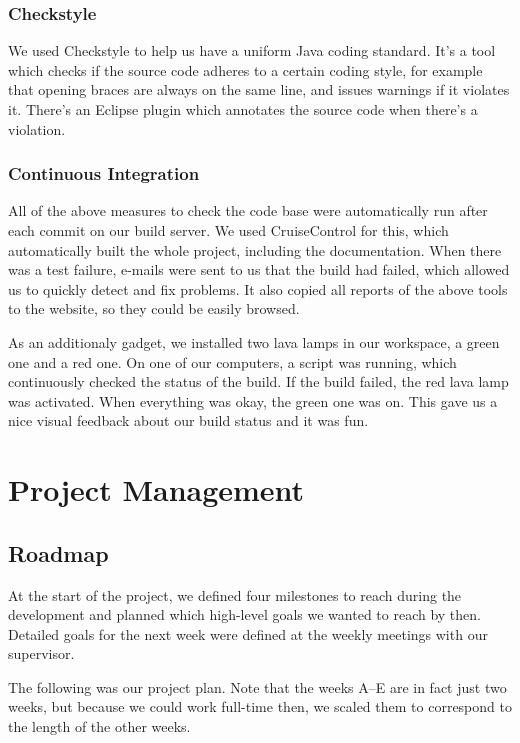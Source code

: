 \documentclass[12pt,halfparskip,DIV11,BCOR10mm]{scrreprt}
\begin{document}
\subsection{Checkstyle}

We used Checkstyle to help us have a uniform Java coding standard. It's a tool which checks if the source code adheres to a certain coding style, for example that opening braces are always on the same line, and issues warnings if it violates it. There's an Eclipse plugin which annotates the source code when there's a violation.

\subsection{Continuous Integration}

All of the above measures to check the code base were automatically run after each commit on our build server. We used CruiseControl for this, which automatically built the whole project, including the documentation. When there was a test failure, e-mails were sent to us that the build had failed, which allowed us to quickly detect and fix problems. It also copied all reports of the above tools to the website, so they could be easily browsed.

As an additionaly gadget, we installed two lava lamps in our workspace, a green one and a red one. On one of our computers, a script was running, which continuously checked the status of the build. If the build failed, the red lava lamp was activated. When everything was okay, the green one was on. This gave us a nice visual feedback about our build status and it was fun.


\chapter{Project Management}


\section{Roadmap}

At the start of the project, we defined four milestones to reach during the development and planned which high-level goals we wanted to reach by then. Detailed goals for the next week were defined at the weekly meetings with our supervisor.

The following was our project plan. Note that the weeks A--E are in fact just two weeks, but because we could work full-time then, we scaled them to correspond to the length of the other weeks.
\end{document}
